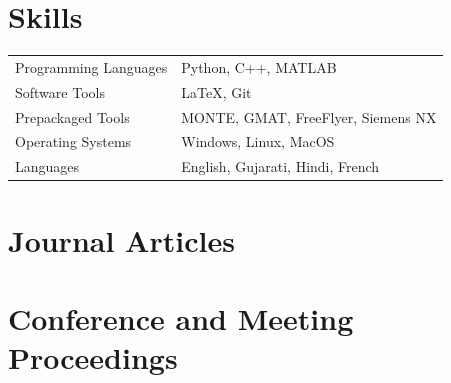 \documentclass[letterpaper,12pt]{article}
\begin{document}
\section{Skills}
\begin{tabularx}{\linewidth}{@{}l X@{}}
Programming Languages  &  Python, C++, MATLAB \\[3.75pt]
Software Tools  &  \LaTeX, Git \\[3.75pt]
Prepackaged Tools  &  MONTE, GMAT, FreeFlyer, Siemens NX \\[3.75pt]
Operating Systems  &  Windows, Linux, MacOS \\[3.75pt]
Languages  &  English, Gujarati, Hindi, French \\[3.75pt]
\end{tabularx}

\newpage
\section{Journal Articles}
\begin{refsection}
\nocite{*}
\printbibliography[heading=none]
\end{refsection}

\section{Conference and Meeting Proceedings}
\begin{refsection}
\nocite{*}
\printbibliography[heading=none]
\end{refsection}

\vfill
{}
\end{document}

